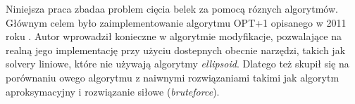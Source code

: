 \begin{streszczenie}
Niniejsza praca zbadaa problem cięcia belek za pomocą róznych algorytmów. Głównym celem było zaimplementowanie algorytmu OPT+1 opisanego w 2011 roku \cite{ALG_OPT_1}. 
Autor wprowadził konieczne w algorytmie modyfikacje, pozwalające na realną jego implementację przy użyciu dostepnych obecnie narzędzi, takich jak solvery liniowe, które nie używają algorytmy \textit{ellipsoid}. Dlatego też skupił się na porównaniu owego algorytmu z naiwnymi rozwiązaniami takimi jak algorytm aproksymacyjny i rozwiązanie siłowe (\textit{bruteforce}).
\end{streszczenie}
